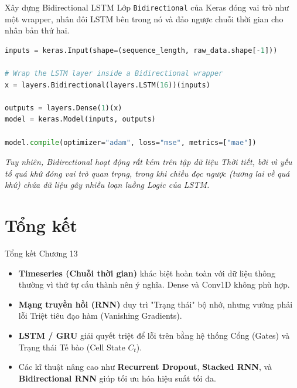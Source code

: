 \documentclass[aspectratio=169]{beamer}
\begin{document}
\begin{frame}[fragile]{Xây dựng Bidirectional LSTM}
Lớp \texttt{Bidirectional} của Keras đóng vai trò như một wrapper, nhân đôi LSTM bên trong nó và đảo ngược chuỗi thời gian cho nhân bản thứ hai.
\begin{lstlisting}[language=Python]
inputs = keras.Input(shape=(sequence_length, raw_data.shape[-1]))

# Wrap the LSTM layer inside a Bidirectional wrapper
x = layers.Bidirectional(layers.LSTM(16))(inputs)

outputs = layers.Dense(1)(x)
model = keras.Model(inputs, outputs)

model.compile(optimizer="adam", loss="mse", metrics=["mae"])
\end{lstlisting}
\textit{Tuy nhiên, Bidirectional hoạt động rất kém trên tập dữ liệu Thời tiết, bởi vì yếu tố quá khứ đóng vai trò quan trọng, trong khi chiều đọc ngược (tương lai về quá khứ) chứa dữ liệu gây nhiễu loạn luồng Logic của LSTM.}
\end{frame}

\section{Tổng kết}

\begin{frame}{Tổng kết Chương 13}
    \begin{itemize}
        \item \textbf{Timeseries (Chuỗi thời gian)} khác biệt hoàn toàn với dữ liệu thông thường vì thứ tự cấu thành nên ý nghĩa. Dense và Conv1D không phù hợp.
        \item \textbf{Mạng truyền hồi (RNN)} duy trì "Trạng thái" bộ nhớ, nhưng vướng phải lỗi Triệt tiêu đạo hàm (Vanishing Gradients).
        \item \textbf{LSTM / GRU} giải quyết triệt để lỗi trên bằng hệ thống Cổng (Gates) và Trạng thái Tế bào (Cell State $C_t$).
        \item Các kĩ thuật nâng cao như \textbf{Recurrent Dropout}, \textbf{Stacked RNN}, và \textbf{Bidirectional RNN} giúp tối ưu hóa hiệu suất tối đa.
    \end{itemize}
\end{frame}
\end{document}
